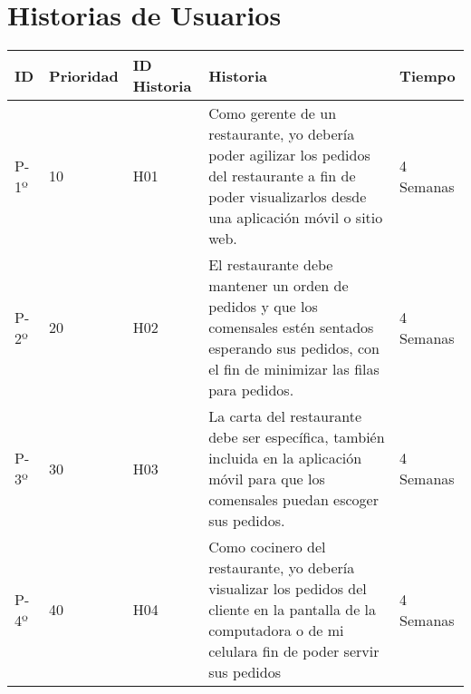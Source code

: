 \chapter{Historias de Usuarios}

\begin{table}[htbp]
	\begin{center}
		\begin{tabular}{| p{0.8cm}| p{2.0cm} | p{2.5 cm} | p{6.0cm}| p{2.0cm} |}
			\hline
			
			\textbf{ID} & \textbf{Prioridad}& \textbf{ID Historia} & \textbf{Historia} & \textbf{Tiempo}
			
			\\\hline
			P-1º & 10 & H01 &
			
			Como gerente de un restaurante, yo debería poder agilizar los pedidos del restaurante a fin de poder visualizarlos desde una aplicación móvil o sitio web.
			
			& 4 Semanas
			
			\\\hline
			P-2º & 20 & H02 &
			
			El restaurante debe mantener un orden de pedidos y que los comensales estén sentados esperando sus pedidos, con el fin de minimizar las filas para pedidos.
			
			& 4 Semanas
			
			\\\hline
			P-3º & 30 & H03 &
			
			La carta del restaurante debe ser específica, también incluida en la aplicación móvil para que los comensales puedan escoger sus pedidos.
			
			& 4 Semanas
			
			\\\hline
			P-4º & 40 & H04 & 
			
			Como cocinero del restaurante, yo debería visualizar los pedidos del cliente en la pantalla de la computadora o de mi celulara fin de poder servir sus pedidos
			
			& 4 Semanas \\\hline
		\end{tabular}
	\end{center}
\end{table}